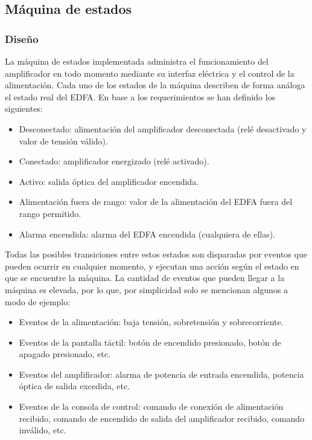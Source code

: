 \subsection{Máquina de estados}
\subsubsection{Diseño}

La máquina de estados implementada administra el funcionamiento del amplificador en todo momento mediante su interfaz eléctrica y el control de la alimentación. Cada uno de los estados de la máquina describen de forma análoga el estado real del EDFA. En base a los requerimientos se han definido los siguientes:

\begin{itemize}
\item Desconectado: alimentación del amplificador desconectada (relé desactivado y valor de tensión válido).
\item Conectado: amplificador energizado (relé activado).
\item Activo: salida óptica del amplificador encendida.
\item Alimentación fuera de rango: valor de la alimentación del EDFA fuera del rango permitido.
\item Alarma encendida: alarma del EDFA encendida (cualquiera de ellas).
\end{itemize}

Todas las posibles transiciones entre estos estados son disparadas por eventos que pueden ocurrir en cualquier momento, y ejecutan una acción según el estado en que se encuentre la máquina. La cantidad de eventos que pueden llegar a la máquina es elevada, por lo que, por simplicidad solo se mencionan algunos a modo de ejemplo:

\begin{itemize}
\item Eventos de la alimentación: baja tensión, sobretensión y sobrecorriente.
\item Eventos de la pantalla táctil: botón de encendido presionado, botón de apagado presionado, etc.
\item Eventos del amplificador: alarma de potencia de entrada encendida, potencia óptica de salida excedida, etc.
\item Eventos de la consola de control: comando de conexión de alimentación recibido, comando de encendido de salida del amplificador recibido, comando inválido, etc.
\end{itemize}

